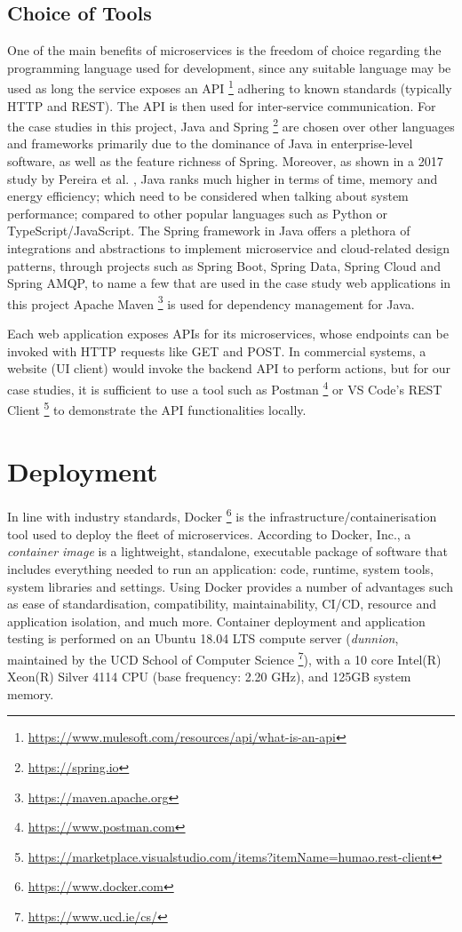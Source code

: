 \subsection{Choice of Tools}

One of the main benefits of microservices is the freedom of choice regarding the programming language used for development, since any suitable language may be used as long the service exposes an API \footnote{\url{https://www.mulesoft.com/resources/api/what-is-an-api}} adhering to known standards (typically HTTP and REST). The API is then used for inter-service communication. For the case studies in this project, Java and Spring \footnote{\url{https://spring.io}} are chosen over other languages and frameworks primarily due to the dominance of Java in enterprise-level software, as well as the feature richness of Spring. Moreover, as shown in a 2017 study by Pereira et al. \cite{pereira17}, Java ranks much higher in terms of time, memory and energy efficiency; which need to be considered when talking about system performance; compared to other popular languages such as Python or TypeScript/JavaScript. The Spring framework in Java offers a plethora of integrations and abstractions to implement microservice and cloud-related design patterns, through projects such as Spring Boot, Spring Data, Spring Cloud and Spring AMQP, to name a few that are used in the case study web applications in this project Apache Maven \footnote{\url{https://maven.apache.org}} is used for dependency management for Java.

Each web application exposes APIs for its microservices, whose endpoints can be invoked with HTTP requests like GET and POST. In commercial systems, a website (UI client) would invoke the backend API to perform actions, but for our case studies, it is sufficient to use a tool such as Postman \footnote{\url{https://www.postman.com}} or VS Code's REST Client \footnote{\url{https://marketplace.visualstudio.com/items?itemName=humao.rest-client}} to demonstrate the API functionalities locally.

\section{Deployment}

In line with industry standards, Docker \footnote{\url{https://www.docker.com}} is the infrastructure/containerisation tool used to deploy the fleet of microservices. According to Docker, Inc., a \textit{container image} is a lightweight, standalone, executable package of software that includes everything needed to run an application: code, runtime, system tools, system libraries and settings. Using Docker provides a number of advantages such as ease of standardisation, compatibility, maintainability, CI/CD, resource and application isolation, and much more. Container deployment and application testing is performed on an Ubuntu 18.04 LTS compute server (\textit{dunnion}, maintained by the UCD School of Computer Science \footnote{\url{https://www.ucd.ie/cs/}}), with a 10 core Intel(R) Xeon(R) Silver 4114 CPU (base frequency: 2.20 GHz), and 125GB system memory.

